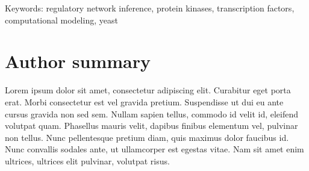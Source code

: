 \documentclass[10pt,letterpaper]{article}
\begin{document}
Keywords: regulatory network inference, protein kinases, transcription factors, computational modeling, yeast


\section*{Author summary}
Lorem ipsum dolor sit amet, consectetur adipiscing elit. Curabitur eget porta erat. Morbi consectetur est vel gravida pretium. Suspendisse ut dui eu ante cursus gravida non sed sem. Nullam sapien tellus, commodo id velit id, eleifend volutpat quam. Phasellus mauris velit, dapibus finibus elementum vel, pulvinar non tellus. Nunc pellentesque pretium diam, quis maximus dolor faucibus id. Nunc convallis sodales ante, ut ullamcorper est egestas vitae. Nam sit amet enim ultrices, ultrices elit pulvinar, volutpat risus.

\linenumbers

\end{document}
